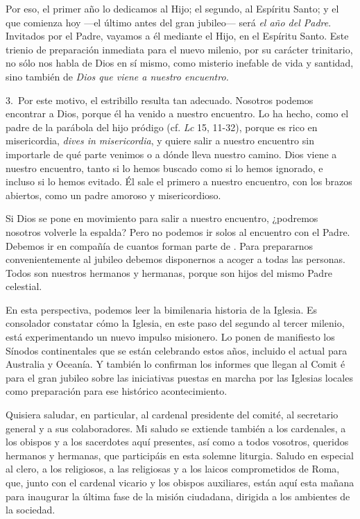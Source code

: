Por eso, el primer año lo dedicamos al Hijo; el segundo, al Espíritu Santo; y el que comienza hoy ---el último antes del gran jubileo--- será \emph{el año del Padre}. Invitados por el Padre, vayamos a él mediante el Hijo, en el Espíritu Santo. Este trienio de preparación inmediata para el nuevo milenio, por su carácter trinitario, no sólo nos habla de Dios en sí mismo, como misterio inefable de vida y santidad, sino también de \emph{Dios que viene a nuestro encuentro.}

3.~Por este motivo, el estribillo  resulta tan adecuado. Nosotros podemos encontrar a Dios, porque él ha venido a nuestro encuentro. Lo ha hecho, como el padre de la parábola del hijo pródigo (cf. \emph{Lc} 15, 11-32), porque es rico en misericordia, \emph{dives in misericordia}, y quiere salir a nuestro encuentro sin importarle de qué parte venimos o a dónde lleva nuestro camino. Dios viene a nuestro encuentro, tanto si lo hemos buscado como si lo hemos ignorado, e incluso si lo hemos evitado. Él sale el primero a nuestro encuentro, con los brazos abiertos, como un padre amoroso y misericordioso.

Si Dios se pone en movimiento para salir a nuestro encuentro, ¿podremos nosotros volverle la espalda? Pero no podemos ir solos al encuentro con el Padre. Debemos ir en compañía de cuantos forman parte de . Para prepararnos convenientemente al jubileo debemos disponernos a acoger a todas las personas. Todos son nuestros hermanos y hermanas, porque son hijos del mismo Padre celestial.

En esta perspectiva, podemos leer la bimilenaria historia de la Iglesia. Es consolador constatar cómo la Iglesia, en este paso del segundo al tercer milenio, está experimentando un nuevo impulso misionero. Lo ponen de manifiesto los Sínodos continentales que se están celebrando estos años, incluido el actual para Australia y Oceanía. Y también lo confirman los informes que llegan al Comit é para el gran jubileo sobre las iniciativas puestas en marcha por las Iglesias locales como preparación para ese histórico acontecimiento.

Quisiera saludar, en particular, al cardenal presidente del comité, al secretario general y a sus colaboradores. Mi saludo se extiende también a los cardenales, a los obispos y a los sacerdotes aquí presentes, así como a todos vosotros, queridos hermanos y hermanas, que participáis en esta solemne liturgia. Saludo en especial al clero, a los religiosos, a las religiosas y a los laicos comprometidos de Roma, que, junto con el cardenal vicario y los obispos auxiliares, están aquí esta mañana para inaugurar la última fase de la misión ciudadana, dirigida a los ambientes de la sociedad.


